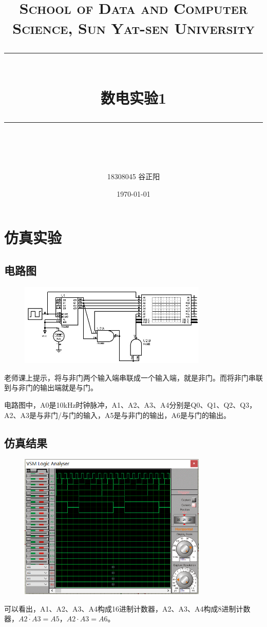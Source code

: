 \documentclass[UTF8, a4paper, 11pt]{article}
\title{	
\normalfont \normalsize
\textsc{School of Data and Computer Science, Sun Yat-sen University} \\ [25pt] %
\rule{\textwidth}{0.5pt} \\[0.4cm] %
\huge 数电实验1\\ %
\rule{\textwidth}{2pt} \\[0.5cm] %
\author{18308045 谷正阳}
\date{\normalsize\today}
}
\begin{document}
\maketitle
\tableofcontents
\newpage
\section{仿真实验}
\subsection{电路图}
\begin{figure}[H]
    \centering
    \includegraphics[width=0.8\textwidth]{电路图.jpg}
\end{figure}
老师课上提示，将与非门两个输入端串联成一个输入端，就是非门。而将非门串联到与非门的输出端就是与门。

电路图中，A0是10kHz时钟脉冲，A1、A2、A3、A4分别是Q0、Q1、Q2、Q3，A2、A3是与非门/与门的输入，A5是与非门的输出，A6是与门的输出。
\subsection{仿真结果}
\begin{figure}[H]
    \centering
    \includegraphics[width=0.8\textwidth]{analyser.png}
\end{figure}
可以看出，A1、A2、A3、A4构成16进制计数器，A2、A3、A4构成8进制计数器，$\overline{A2\cdot A3}=A5$，$A2\cdot A3=A6$。
\end{document}
